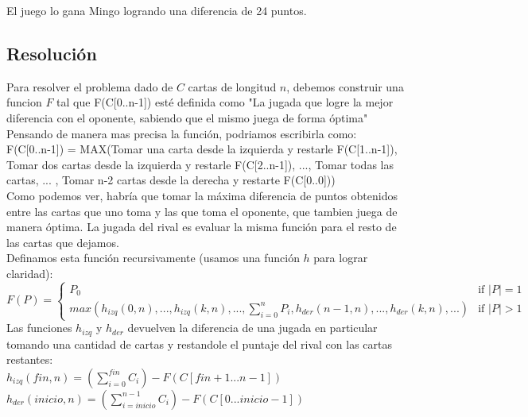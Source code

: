 El juego lo gana Mingo logrando una diferencia de 24 puntos.

\subsection{Resoluci\'on}

Para resolver el problema dado de $C$ cartas de longitud $n$, debemos construir una funcion $F$ tal que F(C[0..n-1]) est\'e definida como "La jugada que logre la mejor diferencia con el oponente, sabiendo que el mismo juega de forma \'optima" \\

Pensando de manera mas precisa la funci\'on, podriamos escribirla como: \\

F(C[0..n-1]) = MAX(Tomar una carta desde la izquierda y restarle F(C[1..n-1]), Tomar dos cartas desde la izquierda y restarle F(C[2..n-1]), ..., Tomar todas las cartas, ... , Tomar n-2 cartas desde la derecha y restarte F(C[0..0])) \\

Como podemos ver, habr\'ia que tomar la m\'axima diferencia de puntos obtenidos entre las cartas que uno toma y las que toma el oponente, que tambien juega de manera \'optima. La jugada del rival es evaluar la misma funci\'on para el resto de las cartas que dejamos. \\

Definamos esta funci\'on recursivamente (usamos una funci\'on $h$ para lograr claridad): \\

$
F(P) =
\left\{
	\begin{array}{ll}
		P_{0}  & \mbox{if } |P| = 1 \\
		max( h_{izq} (0, n), ... , h_{izq} (k, n) , ... , \sum\limits_{i=0}^n P_{i} , h_{der} (n-1, n), ... , h_{der} (k, n) , ... )  & \mbox{if } |P| > 1
	\end{array}
\right.
$ \\

Las funciones $h_{izq}$ y $h_{der}$ devuelven la diferencia de una jugada en particular tomando una cantidad de cartas y restandole el puntaje del rival con las cartas restantes: \\

$h_{izq}(fin, n) =  (\sum\limits_{i=0}^{fin} C_{i}) - F(C[fin+1...n-1])$ \\
$h_{der}(inicio, n) =  (\sum\limits_{i=inicio}^{n-1} C_{i}) - F(C[0...inicio-1])$\\

